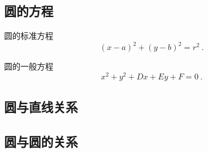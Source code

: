 
\begin{issues}
\issueDraft
\end{issues}


\subsection{圆的方程}
\begin{definition}{圆的标准方程}
\begin{equation}
(x-a)^2+(y-b)^2=r^2~.
\end{equation}
\end{definition}

\begin{definition}{圆的一般方程}
\begin{equation}
x^2+y^2+Dx+Ey+F=0~.
\end{equation}
\end{definition}

\subsection{圆与直线关系}

\subsection{圆与圆的关系}